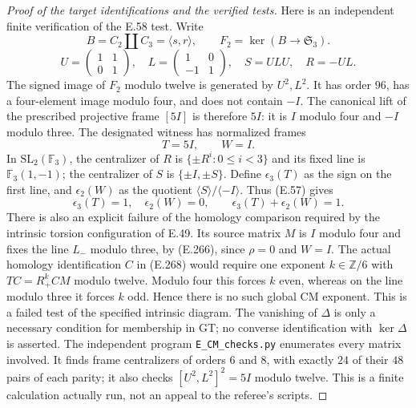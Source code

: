 \begin{proof}[Proof of the target identifications and the verified tests]
Here is an independent finite verification of the
E.58 test.  Write
\[
 B=C_2\amalg C_3=\langle s,r\rangle,\qquad
 F_2=\ker(B\to\mathfrak S_3).
\]
\[
 U=\begin{pmatrix}1&1\\0&1\end{pmatrix},\quad
 L=\begin{pmatrix}1&0\\-1&1\end{pmatrix},\quad
 S=ULU,\quad R=-UL.
\]
The signed image of $F_2$ modulo twelve is generated
by $U^2,L^2$.  It has order $96$, has a four-element
image modulo four, and does not contain $-I$.
The canonical lift of the prescribed projective
frame $[5I]$ is therefore $5I$: it is $I$ modulo
four and $-I$ modulo three.  The designated witness
has normalized frames
\[
                    T=5I,\qquad W=I.                       \tag{E.57}
\]
In $\mathrm{SL}_2(\mathbb F_3)$, the centralizer
of $R$ is $\{\pm R^i:0\leq i<3\}$ and its
fixed line is $\mathbb F_3(1,-1)$; the centralizer
of $S$ is $\{\pm I,\pm S\}$.  Define
$\epsilon_3(T)$ as the sign on the first line,
and $\epsilon_2(W)$ as the quotient
$\langle S\rangle/\langle-I\rangle$.
Thus (E.57) gives
\[
             \epsilon_3(T)=1,\quad\epsilon_2(W)=0,
             \qquad\epsilon_3(T)+\epsilon_2(W)=1.          \tag{E.58}
\]
There is also an explicit failure of the homology
comparison required by the intrinsic torsion
configuration of E.49. Its source matrix $M$ is
$I$ modulo four and fixes the line $L_-$ modulo
three, by (E.266), since $\rho=0$ and $W=I$.
The actual homology identification $C$ in (E.268)
would require one exponent $k\in\mathbb Z/6$ with
$TC=R_+^kCM$ modulo twelve. Modulo four this
forces $k$ even, whereas on the line modulo three
it forces $k$ odd. Hence there is no such global
CM exponent. This is a failed test of the specified
intrinsic diagram. The vanishing of $\Delta$ is
only a necessary condition for membership in GT;
no converse identification with $\ker\Delta$ is
asserted.
The independent program \texttt{E\_CM\_checks.py}
enumerates every matrix involved.  It finds frame
centralizers of orders $6$ and $8$, with exactly
$24$ of their $48$ pairs of each parity; it also
checks $[U^2,L^2]^2=5I$ modulo twelve.  This is a
finite calculation actually run, not an appeal to
the referee's scripts.


\end{proof}
